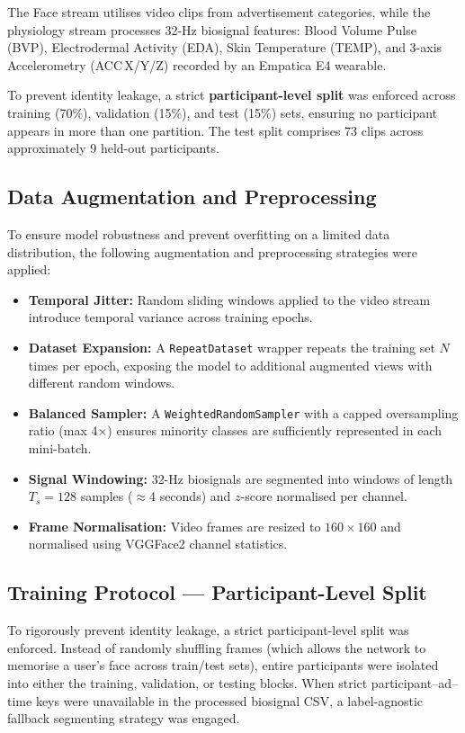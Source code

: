 \documentclass[12pt, a4paper]{article}
\begin{document}
The Face stream utilises video clips from advertisement categories, while the physiology stream processes 32-Hz biosignal features: Blood Volume Pulse (BVP), Electrodermal Activity (EDA), Skin Temperature (TEMP), and 3-axis Accelerometry (ACC\,X/Y/Z) recorded by an Empatica E4 wearable.

To prevent identity leakage, a strict \textbf{participant-level split} was enforced across training (70\%), validation (15\%), and test (15\%) sets, ensuring no participant appears in more than one partition. The test split comprises 73 clips across approximately 9 held-out participants.

\subsection{Data Augmentation and Preprocessing}

To ensure model robustness and prevent overfitting on a limited data distribution, the following augmentation and preprocessing strategies were applied:

\begin{itemize}
    \item \textbf{Temporal Jitter:} Random sliding windows applied to the video stream introduce temporal variance across training epochs.
    \item \textbf{Dataset Expansion:} A \texttt{RepeatDataset} wrapper repeats the training set $N$ times per epoch, exposing the model to additional augmented views with different random windows.
    \item \textbf{Balanced Sampler:} A \texttt{WeightedRandomSampler} with a capped oversampling ratio (max 4$\times$) ensures minority classes are sufficiently represented in each mini-batch.
    \item \textbf{Signal Windowing:} 32-Hz biosignals are segmented into windows of length $T_s = 128$ samples ($\approx$4 seconds) and $z$-score normalised per channel.
    \item \textbf{Frame Normalisation:} Video frames are resized to $160 \times 160$ and normalised using VGGFace2 channel statistics.
\end{itemize}

\subsection{Training Protocol --- Participant-Level Split}

To rigorously prevent identity leakage, a strict participant-level split was enforced. Instead of randomly shuffling frames (which allows the network to memorise a user's face across train/test sets), entire participants were isolated into either the training, validation, or testing blocks. When strict participant--ad--time keys were unavailable in the processed biosignal CSV, a label-agnostic fallback segmenting strategy was engaged.
\end{document}
